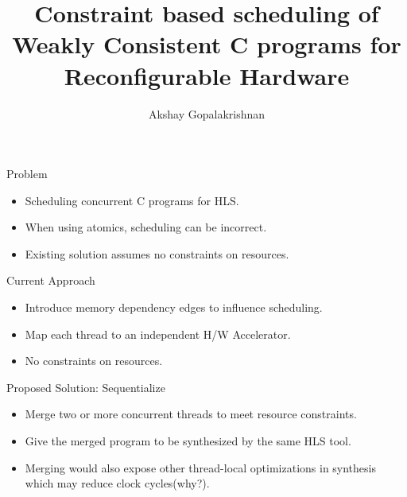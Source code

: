 \documentclass[notes, xcolor=dvipsnames]{beamer}
\title{Constraint based scheduling of Weakly Consistent C programs for Reconfigurable Hardware}
\author{Akshay Gopalakrishnan}
\begin{document}
    \begin{frame}
        
        \maketitle

    \end{frame}

    \begin{frame}{Problem}

        \begin{itemize}
            \item Scheduling concurrent C programs for HLS. 
            \item When using atomics, scheduling can be incorrect. 
            \item Existing solution assumes no constraints on resources.
        \end{itemize}

    \end{frame}

    \begin{frame}{Current Approach}

        \begin{itemize}
            \item Introduce memory dependency edges to influence scheduling. 
            \item Map each thread to an independent H/W Accelerator.
            \item No constraints on resources. 
        \end{itemize}

    \end{frame}

    \begin{frame}{Proposed Solution: Sequentialize}

        \begin{itemize}
            \item Merge two or more concurrent threads to meet resource constraints. 
            \item Give the merged program to be synthesized by the same HLS tool. 
            \item Merging would also expose other thread-local optimizations in synthesis which may reduce clock cycles(why?).
        \end{itemize}

    \end{frame}
\end{document}
